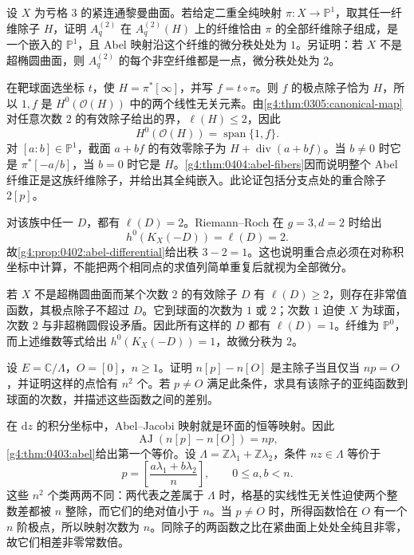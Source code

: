 \begin{exercise}
	\label{g4:ex:0404:genus-three-fibers}
	设 \(X\) 为亏格 \(3\) 的紧连通黎曼曲面。若给定二重全纯映射 \(\pi:X\to\mathbb P^1\)，取其任一纤维除子 \(H\)，证明 \(A_q^{(2)}\) 在 \(A_q^{(2)}(H)\) 上的纤维恰由 \(\pi\) 的全部纤维除子组成，是一个嵌入的 \(\mathbb P^1\)，且 Abel 映射沿这个纤维的微分秩处处为 \(1\)。另证明：若 \(X\) 不是超椭圆曲面，则 \(A_q^{(2)}\) 的每个非空纤维都是一点，微分秩处处为 \(2\)。
\end{exercise}
\begin{solution}
	在靶球面选坐标 \(t\)，使 \(H=\pi^*[\infty]\)，并写 \(f=t\circ\pi\)。则 \(f\) 的极点除子恰为 \(H\)，所以 \(1,f\) 是 \(H^0(\mathcal O(H))\) 中的两个线性无关元素。由\cref{g4:thm:0305:canonical-map}对任意次数 \(2\) 的有效除子给出的界，\(\ell(H)\le2\)，因此
	\[
		H^0(\mathcal O(H))=\operatorname{span}\{1,f\}.
	\]
	对 \([a:b]\in\mathbb P^1\)，截面 \(a+bf\) 的有效零除子为 \(H+\operatorname{div}(a+bf)\)。当 \(b\ne0\) 时它是 \(\pi^*[-a/b]\)，当 \(b=0\) 时它是 \(H\)。\cref{g4:thm:0404:abel-fibers}因而说明整个 Abel 纤维正是这族纤维除子，并给出其全纯嵌入。此论证包括分支点处的重合除子 \(2[p]\)。

	对该族中任一 \(D\)，都有 \(\ell(D)=2\)。Riemann--Roch 在 \(g=3,d=2\) 时给出
	\[
		h^0(K_X(-D))=\ell(D)=2.
	\]
	故\cref{g4:prop:0402:abel-differential}给出秩 \(3-2=1\)。这也说明重合点必须在对称积坐标中计算，不能把两个相同点的求值列简单重复后就视为全部微分。

	若 \(X\) 不是超椭圆曲面而某个次数 \(2\) 的有效除子 \(D\) 有 \(\ell(D)\ge2\)，则存在非常值函数，其极点除子不超过 \(D\)。它到球面的次数为 \(1\) 或 \(2\)；次数 \(1\) 迫使 \(X\) 为球面，次数 \(2\) 与非超椭圆假设矛盾。因此所有这样的 \(D\) 都有 \(\ell(D)=1\)。纤维为 \(\mathbb P^0\)，而上述维数等式给出 \(h^0(K_X(-D))=1\)，故微分秩为 \(2\)。
\end{solution}

\begin{exercise}
	\label{g4:ex:0403:torsion-divisor}
	设 \(E=\mathbb C/\Lambda\)，\(O=[0]\)，\(n\ge1\)。证明 \(n[p]-n[O]\) 是主除子当且仅当 \(np=O\)，并证明这样的点恰有 \(n^2\) 个。若 \(p\ne O\) 满足此条件，求具有该除子的亚纯函数到球面的次数，并描述这些函数之间的差别。
\end{exercise}
\begin{solution}
	在 \(\mathrm{d}z\) 的积分坐标中，Abel--Jacobi 映射就是环面的恒等映射。因此
	\[
		\operatorname{AJ}(n[p]-n[O])=np,
	\]
	\cref{g4:thm:0403:abel}给出第一个等价。设 \(\Lambda=\mathbb Z\lambda_1+\mathbb Z\lambda_2\)，条件 \(nz\in\Lambda\) 等价于
	\[
		p=\left[\frac{a\lambda_1+b\lambda_2}{n}\right],
		\qquad 0\le a,b<n.
	\]
	这些 \(n^2\) 个类两两不同：两代表之差属于 \(\Lambda\) 时，格基的实线性无关性迫使两个整数差都被 \(n\) 整除，而它们的绝对值小于 \(n\)。当 \(p\ne O\) 时，所得函数恰在 \(O\) 有一个 \(n\) 阶极点，所以映射次数为 \(n\)。同除子的两函数之比在紧曲面上处处全纯且非零，故它们相差非零常数倍。
\end{solution}


